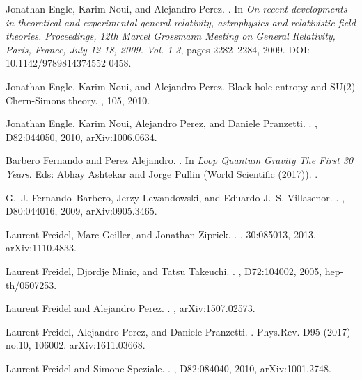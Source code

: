 \documentclass[aps, nofootinbib,superscriptaddress,12pt]{revtex4-2}
\begin{document}
\begin{thebibliography}{100}
Jonathan Engle, Karim Noui, and Alejandro Perez.
.
\newblock In {\em {On recent developments in theoretical and experimental
  general relativity, astrophysics and relativistic field theories.
  Proceedings, 12th Marcel Grossmann Meeting on General Relativity, Paris,
  France, July 12-18, 2009. Vol. 1-3}}, pages 2282--2284, 2009. DOI: 10.1142/9789814374552 0458.

Jonathan Engle, Karim Noui, and Alejandro Perez.
\newblock Black hole entropy and {SU}(2) {C}hern-{S}imons theory.
, 105, 2010.

Jonathan Engle, Karim Noui, Alejandro Perez, and Daniele Pranzetti.
.
, D82:044050, 2010, arXiv:1006.0634.

Barbero Fernando and Perez Alejandro.
.
In  {\em Loop Quantum Gravity The First 30 Years}.
Eds: Abhay Ashtekar and Jorge Pullin (World Scientific (2017)).
.

G.~J. Fernando~Barbero, Jerzy Lewandowski, and Eduardo J.~S. Villasenor.
.
, D80:044016, 2009, arXiv:0905.3465.

Laurent Freidel, Marc Geiller, and Jonathan Ziprick.
.
, 30:085013, 2013, arXiv:1110.4833.

Laurent Freidel, Djordje Minic, and Tatsu Takeuchi.
.
, D72:104002, 2005, hep-th/0507253.

Laurent Freidel and Alejandro Perez.
.
, arXiv:1507.02573.

Laurent Freidel, Alejandro Perez, and Daniele Pranzetti.
.
\newblock  Phys.Rev. D95 (2017) no.10, 106002.
\newblock  arXiv:1611.03668.

Laurent Freidel and Simone Speziale.
.
, D82:084040, 2010, arXiv:1001.2748.


\end{thebibliography}
\end{document}
